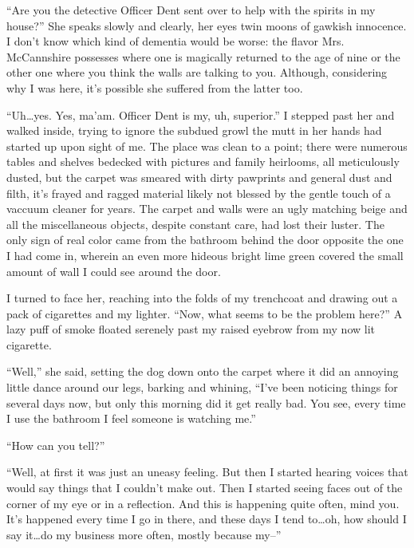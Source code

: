 ``Are you the detective Officer Dent sent over to help with the
spirits in my house?'' She speaks slowly and clearly, her eyes twin
moons of gawkish innocence. I don't know which kind of dementia
would be worse: the flavor Mrs. McCannshire possesses where one is
magically returned to the age of nine or the other one where you
think the walls are talking to you. Although, considering why I was
here, it's possible she suffered from the latter too.



``Uh{\ldots}yes. Yes, ma'am. Officer Dent is my, uh, superior.'' I stepped
past her and walked inside, trying to ignore the subdued growl the
mutt in her hands had started up upon sight of me. The place was
clean to a point; there were numerous tables and shelves bedecked
with pictures and family heirlooms, all meticulously dusted, but
the carpet was smeared with dirty pawprints and general dust and
filth, it's frayed and ragged material likely not blessed by the
gentle touch of a vaccuum cleaner for years. The carpet and walls
were an ugly matching beige and all the miscellaneous objects,
despite constant care, had lost their luster. The only sign of real
color came from the bathroom behind the door opposite the one I had
come in, wherein an even more hideous bright lime green covered the
small amount of wall I could see around the door.



I turned to face her, reaching into the folds of my trenchcoat and
drawing out a pack of cigarettes and my lighter. ``Now, what seems
to be the problem here?'' A lazy puff of smoke floated serenely past
my raised eyebrow from my now lit cigarette.



``Well,'' she said, setting the dog down onto the carpet where it did
an annoying little dance around our legs, barking and whining,
``I've been noticing things for several days now, but only this
morning did it get really bad. You see, every time I use the
bathroom I feel someone is watching me.''



``How can you tell?''



``Well, at first it was just an uneasy feeling. But then I started
hearing voices that would say things that I couldn't make out. Then
I started seeing faces out of the corner of my eye or in a
reflection. And this is happening quite often, mind you. It's
happened every time I go in there, and these days I tend to{\ldots}oh,
how should I say it{\ldots}do my business more often, mostly because
my--''



